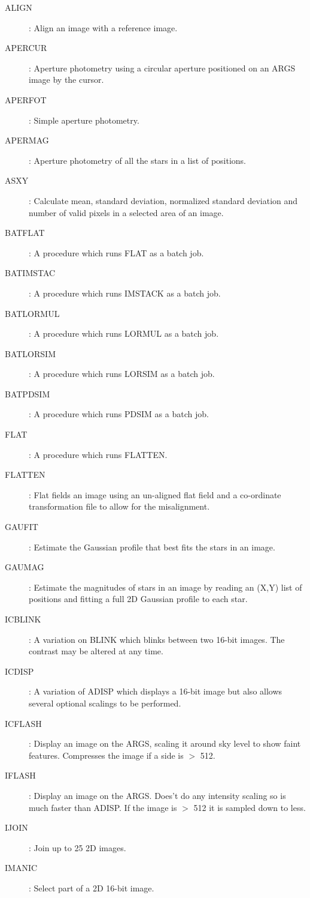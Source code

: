 \begin{description}
\item [ALIGN]: Align an image with a reference image.
\item [APERCUR]: Aperture photometry using a circular aperture positioned on an
ARGS image by the cursor.
\item [APERFOT]: Simple aperture photometry.
\item [APERMAG]: Aperture photometry of all the stars in a list of positions.
\item [ASXY]: Calculate mean, standard deviation, normalized standard deviation
and number of valid pixels in a selected area of an image.
\item [BATFLAT]: A procedure which runs FLAT as a batch job.
\item [BATIMSTAC]: A procedure which runs IMSTACK as a batch job.
\item [BATLORMUL]: A procedure which runs LORMUL as a batch job.
\item [BATLORSIM]: A procedure which runs LORSIM as a batch job.
\item [BATPDSIM]: A procedure which runs PDSIM as a batch job.
\item [FLAT]: A procedure which runs FLATTEN.
\item [FLATTEN]: Flat fields an image using an un-aligned flat field and a
co-ordinate transformation file to allow for the misalignment.
\item [GAUFIT]: Estimate the Gaussian profile that best fits the stars in an
image.
\item [GAUMAG]: Estimate the magnitudes of stars in an image by reading an
(X,Y) list of positions and fitting a full 2D Gaussian profile to each star.
\item [ICBLINK]: A variation on BLINK which blinks between two 16-bit images.
The contrast may be altered at any time.
\item [ICDISP]: A variation of ADISP which displays a 16-bit image but also
allows several optional scalings to be performed.
\item [ICFLASH]: Display an image on the ARGS, scaling it around sky level to
show faint features.
Compresses the image if a side is $>$ 512.
\item [IFLASH]: Display an image on the ARGS.
Does't do any intensity scaling so is much faster than ADISP.
If the image is $>$ 512 it is sampled down to less.
\item [IJOIN]: Join up to 25 2D images.
\item [IMANIC]: Select part of a 2D 16-bit image.

\end{description}
